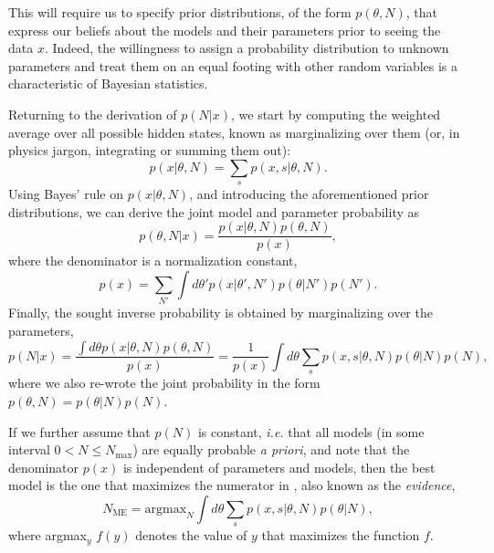 This will require us to specify prior distributions, of the form
$p(\theta,N)$, that express our beliefs about the models and their
parameters prior to seeing the data $x$.  Indeed, the willingness to
assign a probability distribution to unknown parameters and treat them
on an equal footing with other random variables is a characteristic of
Bayesian statistics.

Returning to the derivation of $p(N|x)$, we start by computing the
weighted average over all possible hidden states, known as marginalizing
over them (or, in physics jargon, integrating or summing them out):
\begin{equation}\label{eq:s_marginalize}
  p(x|\theta,N)=\sum_s p(x,s|\theta,N).
\end{equation}
Using Bayes' rule on $p(x|\theta,N)$, and introducing the
aforementioned prior distributions, we can derive the joint model and
parameter probability as
\begin{equation}\label{eq:posterior}
p(\theta,N|x)=\frac{p(x|\theta,N)p(\theta,N)}{p(x)},
\end{equation}
where the denominator is a normalization constant,
\begin{equation}
p(x)=\sum_{N'}\int d\theta' p(x|\theta',N')p(\theta|N')p(N').
\end{equation}
Finally, the sought inverse probability is 
obtained by marginalizing over the parameters,
\begin{equation}\label{eq:pnx}
p(N|x)=\frac{\int d\theta p(x|\theta,N)p(\theta,N)}{p(x)}
=\frac{1}{p(x)}\int d\theta\sum_s p(x,s|\theta,N)p(\theta|N)p(N),
\end{equation}
where we also re-wrote the joint probability in the form
$p(\theta,N)=p(\theta|N)p(N)$.

If we further assume that $p(N)$ is constant, \textit{i.e.} that all models
(in some interval $0<N\le N_\text{max}$) are equally probable \emph{a
priori}, and note that the denominator $p(x)$ is independent of
parameters and models, then the best model is the one that maximizes the
numerator in , also known as the \emph{evidence},
\begin{equation}\label{eq:MEdef}
N_\text{ME}=
\mathrm{argmax}_N \int d\theta\sum_s p(x,s|\theta,N)p(\theta|N),
\end{equation}
where argmax$_y$ $f(y)$ denotes the value of $y$ that maximizes the
function $f$. 


